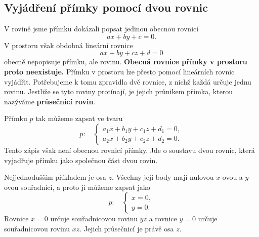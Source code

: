 \subsection{Vyjádření přímky pomocí dvou rovnic}
\label{subsec:Line_in_space_as_intersection_of_planes}

V rovině jsme přímku dokázali popsat jedinou obecnou rovnicí
\[
    ax+by+c=0.
\]
V prostoru však obdobná lineární rovnice
\[
    ax+by+cz+d=0
\]
obecně nepopisuje přímku, ale rovinu. \textbf{Obecná rovnice přímky
v prostoru proto neexistuje.}
Přímku v prostoru lze přesto pomocí lineárních rovnic vyjádřit. Potřebujeme
k tomu zpravidla dvě rovnice, z nichž každá určuje jednu rovinu. Jestliže
se tyto roviny protínají, je jejich průnikem přímka, kterou nazýváme
\textbf{průsečnicí rovin}.

Přímku $p$ tak můžeme zapsat ve tvaru
\[
    p:\quad
    \begin{cases}
        a_1x+b_1y+c_1z+d_1=0,\\
        a_2x+b_2y+c_2z+d_2=0.
    \end{cases}
\]
Tento zápis však není obecnou rovnicí přímky. Jde o soustavu dvou rovnic,
která vyjadřuje přímku jako společnou část dvou rovin.

Nejjednodušším příkladem je osa $z$. Všechny její body mají nulovou
$x$-ovou a $y$-ovou souřadnici, a proto ji můžeme zapsat jako
\[
    p:\quad
    \begin{cases}
        x=0,\\
        y=0.
    \end{cases}
\]
Rovnice $x=0$ určuje souřadnicovou rovinu $yz$ a rovnice $y=0$ určuje
souřadnicovou rovinu $xz$. Jejich průsečnicí je právě osa $z$.

